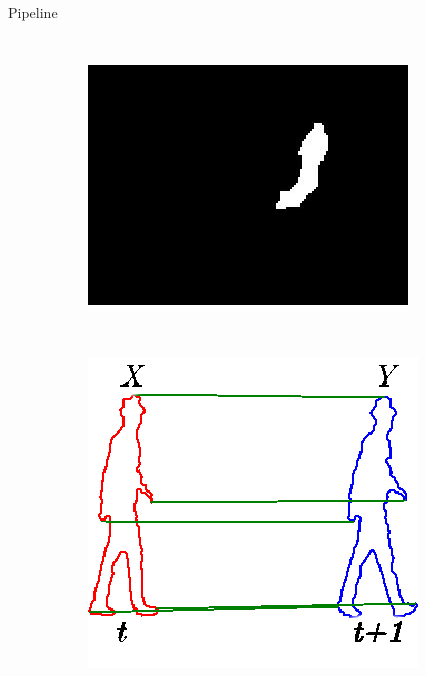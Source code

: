 \begin{frame}[plain]{Pipeline}
\begin{columns}[c]
\begin{figure}[t]
\begin{subfigure}[b]{0.3\columnwidth}
	    \includegraphics[width=\textwidth]{fig17}
	\end{subfigure}%
	~
	\begin{subfigure}[b]{0.3\columnwidth}
	    \includegraphics[width=\textwidth]{twoSets2}
	\end{subfigure}%
	~
	\begin{subfigure}[b]{0.3\columnwidth}

\end{subfigure}
\end{figure}
\end{columns}
\end{frame}
